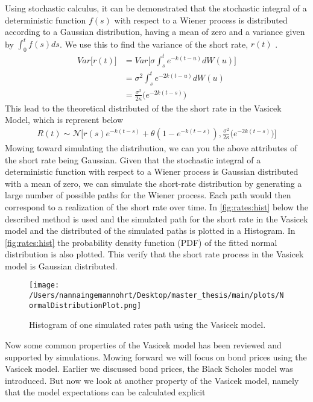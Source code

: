Using stochastic calculus, it can be demonstrated that the stochastic integral of a deterministic function 
$f(s)$ with respect to a Wiener process is distributed according to a Gaussian distribution,
having a mean of zero and a variance given by $\int_0^t f(s) ds$. We use this to find the variance of the short rate,
$r(t)$ \cite{Bjork}.
\begin{align*}
    Var\Big[r(t)\Big] &= Var\Big[\sigma \int_{s}^{t}e^{-k(t-u)} d W(u) \Big] \\
    &= \sigma^2 \int_{s}^{t}e^{-2k(t-u)} d W(u) \\
    &= \frac{\sigma^2}{2\kappa} \Big(e^{-2k(t-s)}\Big)
    \end{align*}
This lead to the theoretical distributed of the the short rate in the Vasicek Model, which is represent below
\begin{align*}
    R(t) \sim \mathcal{N} \Big[ r(s) e^{-k(t-s)} + \theta \left( 1 - e^{-k(t-s)} \right) ,
    \frac{\sigma^2}{2\kappa} \Big(e^{-2k(t-s)}\Big) \Big]
\end{align*}
Mowing toward simulating the distribution, we can you the above attributes of the short rate being Gaussian.
Given that the stochastic integral of a deterministic function with respect to a Wiener process is Gaussian distributed
with a mean of zero, we can simulate the short-rate distribution by generating a large number of possible paths
for the Wiener process. Each path would then correspond to a realization of the short rate over time. In \autoref{fig:rates:hist}
below the described method is used and the simulated path for the short rate in the Vasicek model and the distributed of the
simulated paths is plotted in a Histogram. In \autoref{fig:rates:hist} the probability density function (PDF) of the 
fitted normal distribution is also plotted. This verify that the short rate process in the Vasicek model is Gaussian distributed.
\begin{figure}[h]
    \centering
    \texttt{[image: /Users/nannaingemannohrt/Desktop/master\_thesis/main/plots/NormalDistributionPlot.png]}
    \caption{Histogram of one simulated rates path using the Vasicek model.}
    \label{fig:rates:hist}
\end{figure}
Now some common properties of the Vasicek model has been reviewed and supported by simulations. Mowing forward we will 
focus on bond prices using the Vasicek model. Earlier we discussed bond prices, the Black Scholes model was introduced. 
But now we look at another property of the Vasicek model, namely that the model expectations can be calculated explicit 
